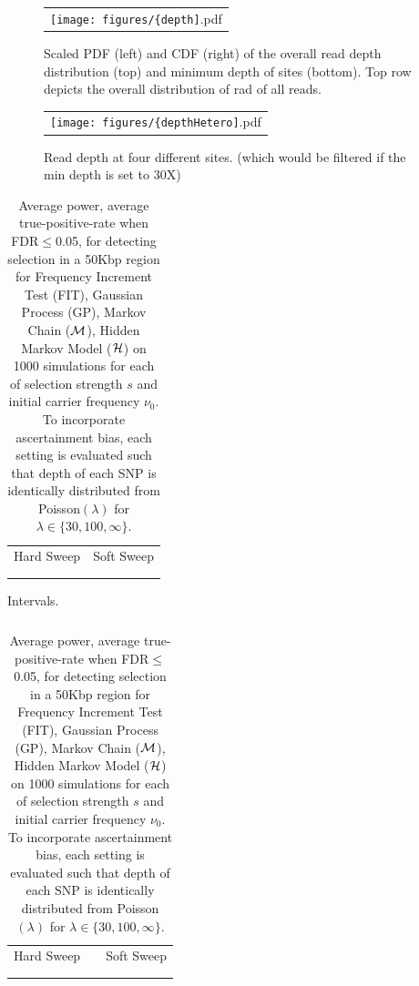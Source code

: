 \documentclass[11pt]{article}
\begin{document}
\begin{figure}[H]
	\centering
	\begin{tabular}{c}
		\texttt{[image: figures/\{depth]}.pdf}
	\end{tabular}
	\caption{Scaled PDF (left) and CDF (right) of the overall read depth distribution (top) and minimum depth of sites (bottom).
		Top row depicts the overall distribution of rad of all reads.} 
	\label{fig:depth}
\end{figure}

\begin{figure}[H]
	\centering
	\begin{tabular}{c}
		\texttt{[image: figures/\{depthHetero]}.pdf}
	\end{tabular}
	\caption{Read depth at four different sites. (which would be filtered if the min depth is set to 30X)} 
	\label{fig:depthHetero}
\end{figure}


\begin{table}[H]
	\begin{tabular}{c||c}
		Hard Sweep & Soft Sweep\\ \\  
		
				&
	\end{tabular}
	\caption{Average power, average true-positive-rate when FDR$\le$0.05, for 
	detecting selection in a 50Kbp region for Frequency Increment Test (FIT), 
	Gaussian Process (GP), Markov Chain (${\cal M}$), Hidden Markov Model (${\cal H}$) on 
	1000 
		simulations for each of selection strength $s$ and initial 
		carrier frequency $\nu_0$. To incorporate ascertainment bias, each 
		setting is evaluated such that depth of each SNP is identically 
		distributed from Poisson$(\lambda)$ for $\lambda \in 
		\{30,100,\infty\}$.}\label{tab:powerCLR}
\end{table}


\begin{table}[h]
	\centering
	\begin{tabular}{c}
		
	\end{tabular}
	\caption{Intervals.}\label{tab:intervals}
\end{table}

\begin{table}[h]
	\centering
	\begin{tabular}{ccc}
		Hard Sweep & &Soft Sweep\\ \\  
		
		&&
	\end{tabular}
	\caption{Average power, average true-positive-rate when FDR$\le$0.05, for 
		detecting selection in a 50Kbp region for Frequency Increment Test 
		(FIT), 
		Gaussian Process (GP), Markov Chain (${\cal M}$), Hidden Markov Model 
		(${\cal H}$) on 
		1000 
		simulations for each of selection strength $s$ and initial 
		carrier frequency $\nu_0$. To incorporate ascertainment bias, each 
		setting is evaluated such that depth of each SNP is identically 
		distributed from Poisson$(\lambda)$ for $\lambda \in 
		\{30,100,\infty\}$.}\label{tab:power}
\end{table}
\end{document}
